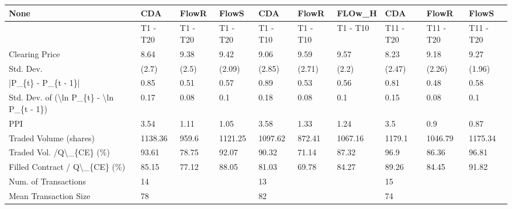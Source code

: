 \begin{tabular}{llllllllll}
\hline
 None                                                      & CDA      & FlowR    & FlowS    & CDA      & FlowR    & FLOw\_H   & CDA       & FlowR     & FlowS     \\
\hline
                                                           & T1 - T20 & T1 - T20 & T1 - T20 & T1 - T10 & T1 - T10 & T1 - T10 & T11 - T20 & T11 - T20 & T11 - T20 \\
 Clearing Price                                            & 8.64     & 9.38     & 9.42     & 9.06     & 9.59     & 9.57     & 8.23      & 9.18      & 9.27      \\
 Std. Dev.                                                 & (2.7)    & (2.5)    & (2.09)   & (2.85)   & (2.71)   & (2.2)    & (2.47)    & (2.26)    & (1.96)    \\
 |P\_\{t\} - P\_\{t - 1\}|                                       & 0.85     & 0.51     & 0.57     & 0.89     & 0.53     & 0.56     & 0.81      & 0.48      & 0.58      \\
 Std. Dev. of (\textbackslash{}ln P\_\{t\} - \textbackslash{}ln P\_\{t - 1\})                  & 0.17     & 0.08     & 0.1      & 0.18     & 0.08     & 0.1      & 0.15      & 0.08      & 0.1       \\
 PPI                                                       & 3.54     & 1.11     & 1.05     & 3.58     & 1.33     & 1.24     & 3.5       & 0.9       & 0.87      \\
 Traded Volume (shares)                                    & 1138.36  & 959.6    & 1121.25  & 1097.62  & 872.41   & 1067.16  & 1179.1    & 1046.79   & 1175.34   \\
 Traded Vol. /Q\textbackslash{}\_\{CE\} (\%)                                  & 93.61    & 78.75    & 92.07    & 90.32    & 71.14    & 87.32    & 96.9      & 86.36     & 96.81     \\
 Filled Contract / Q\textbackslash{}\_\{CE\} (\%)                             & 85.15    & 77.12    & 88.05    & 81.03    & 69.78    & 84.27    & 89.26     & 84.45     & 91.82     \\
 Num. of Transactions                                      & 14       &          &          & 13       &          &          & 15        &           &           \\
 Mean Transaction Size                                     & 78       &          &          & 82       &          &          & 74        &           &           \\

\end{tabular}
